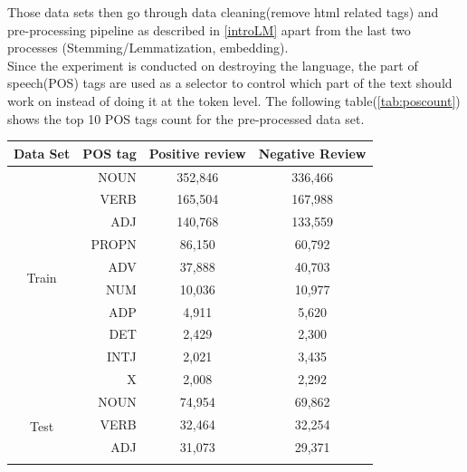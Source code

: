 \documentclass[12pt]{article}
\begin{document}
Those data sets then go through data cleaning(remove html related tags) and pre-processing pipeline as described in \ref{introLM} apart from the last two processes (Stemming/Lemmatization, embedding). \\

Since the experiment is conducted on destroying the language, the part of speech(POS) tags are used as a selector to control which part of the text should work on instead of doing it at the token level. The following table(\ref{tab:poscount}) shows the top 10 POS tags count for the pre-processed data set.

\begin{table}[!h]
\begin{center}
\fontsize{8pt}{8pt}\selectfont
\begin{tabular}{|c|r|c|c|}
\hline
\multicolumn{1}{|l|}{Data Set} & POS tag & Positive review & Negative Review \\ \hline
\multirow{10}{*}{Train}        & NOUN    & 352,846         & 336,466         \\ \cline{2-4} 
                               & VERB    & 165,504         & 167,988         \\ \cline{2-4} 
                               & ADJ     & 140,768         & 133,559         \\ \cline{2-4} 
                               & PROPN   & 86,150          & 60,792          \\ \cline{2-4} 
                               & ADV     & 37,888          & 40,703          \\ \cline{2-4} 
                               & NUM     & 10,036          & 10,977          \\ \cline{2-4} 
                               & ADP     & 4,911           & 5,620           \\ \cline{2-4} 
                               & DET     & 2,429           & 2,300           \\ \cline{2-4} 
                               & INTJ    & 2,021           & 3,435           \\ \cline{2-4} 
                               & X       & 2,008           & 2,292           \\ \hline
\multirow{10}{*}{Test}         & NOUN    & 74,954          & 69,862          \\ \cline{2-4} 
                               & VERB    & 32,464          & 32,254          \\ \cline{2-4} 
                               & ADJ     & 31,073          & 29,371          \\ \cline{2-4} 

\end{tabular}
\end{center}
\end{table}
\end{document}
